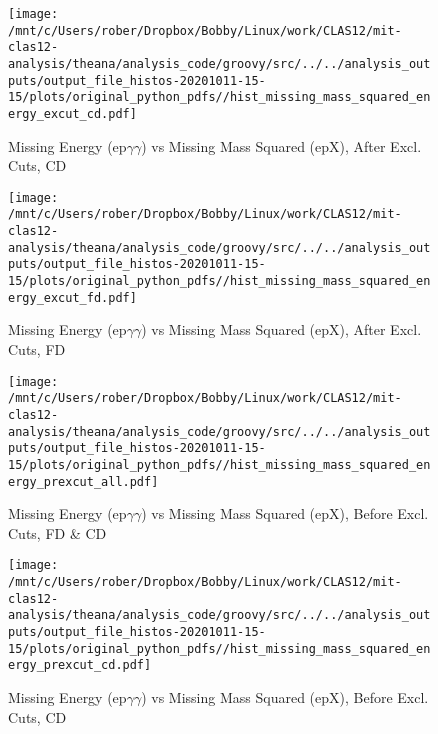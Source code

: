 \documentclass{article}
\begin{document}
\begin{landscape}
    \begin{figure}[h]
        \centering

        \texttt{[image: /mnt/c/Users/rober/Dropbox/Bobby/Linux/work/CLAS12/mit-clas12-analysis/theana/analysis\_code/groovy/src/../../analysis\_outputs/output\_file\_histos-20201011-15-15/plots/original\_python\_pdfs//hist\_missing\_mass\_squared\_energy\_excut\_cd.pdf]}
        \captionsetup{textformat=empty,labelformat=blank}
        \caption{Missing Energy (ep$\gamma$$\gamma$) vs Missing Mass Squared (epX), After Excl. Cuts, CD}
    \end{figure}
    \clearpage
    
    \begin{figure}[h]
        \centering

        \texttt{[image: /mnt/c/Users/rober/Dropbox/Bobby/Linux/work/CLAS12/mit-clas12-analysis/theana/analysis\_code/groovy/src/../../analysis\_outputs/output\_file\_histos-20201011-15-15/plots/original\_python\_pdfs//hist\_missing\_mass\_squared\_energy\_excut\_fd.pdf]}
        \captionsetup{textformat=empty,labelformat=blank}
        \caption{Missing Energy (ep$\gamma$$\gamma$) vs Missing Mass Squared (epX), After Excl. Cuts, FD}
    \end{figure}
    \clearpage
    
    \begin{figure}[h]
        \centering

        \texttt{[image: /mnt/c/Users/rober/Dropbox/Bobby/Linux/work/CLAS12/mit-clas12-analysis/theana/analysis\_code/groovy/src/../../analysis\_outputs/output\_file\_histos-20201011-15-15/plots/original\_python\_pdfs//hist\_missing\_mass\_squared\_energy\_prexcut\_all.pdf]}
        \captionsetup{textformat=empty,labelformat=blank}
        \caption{Missing Energy (ep$\gamma$$\gamma$) vs Missing Mass Squared (epX), Before Excl. Cuts, FD \& CD}
    \end{figure}
    \clearpage
    
    \begin{figure}[h]
        \centering

        \texttt{[image: /mnt/c/Users/rober/Dropbox/Bobby/Linux/work/CLAS12/mit-clas12-analysis/theana/analysis\_code/groovy/src/../../analysis\_outputs/output\_file\_histos-20201011-15-15/plots/original\_python\_pdfs//hist\_missing\_mass\_squared\_energy\_prexcut\_cd.pdf]}
        \captionsetup{textformat=empty,labelformat=blank}
        \caption{Missing Energy (ep$\gamma$$\gamma$) vs Missing Mass Squared (epX), Before Excl. Cuts, CD}
    \end{figure}
    \clearpage
    

\end{landscape}
\end{document}
